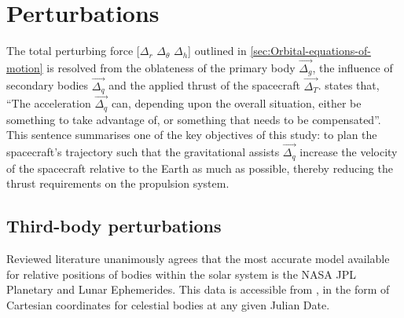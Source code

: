 \section{Perturbations} \label{sec:Perturbations}

The total perturbing force [$\Delta_r$ $\Delta_\theta$ $\Delta_h$] outlined in \autoref{sec:Orbital-equations-of-motion} is resolved from the oblateness of the primary body $\vec{\Delta_g}$, the influence of secondary bodies $\vec{\Delta_q}$ and the applied thrust of the spacecraft $\vec{\Delta_T}$. \textcite{Erb_thesis} states that, \enquote{The acceleration $\vec{\Delta_q}$ can, depending upon the overall situation, either be something to take advantage of, or something that needs to be compensated}. This sentence summarises one of the key objectives of this study: to plan the spacecraft's trajectory such that the gravitational assists $\vec{\Delta_q}$ increase the velocity of the spacecraft relative to the Earth as much as possible, thereby reducing the thrust requirements on the propulsion system.



\subsection{Third-body perturbations} \label{sub:Ephemerides}

Reviewed literature unanimously agrees that the most accurate model available for relative positions of bodies within the solar system is the NASA JPL Planetary and Lunar Ephemerides. This data is accessible from \textcite{web_JetPropulsionLaboratory2004}, in the form of Cartesian coordinates for celestial bodies at any given Julian Date.

